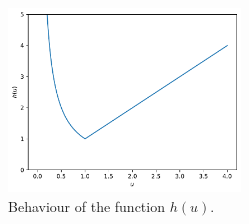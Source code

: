\documentclass[11pt,a4paper]{article}
\begin{document}
\begin{figure}[!htb]
    \centering
    \includegraphics[width=0.55\textwidth]{figures/convex-function.pdf}
    \caption{Behaviour of the function $h(u)$.}\label{fig:convex-function}
\end{figure}
\end{document}
